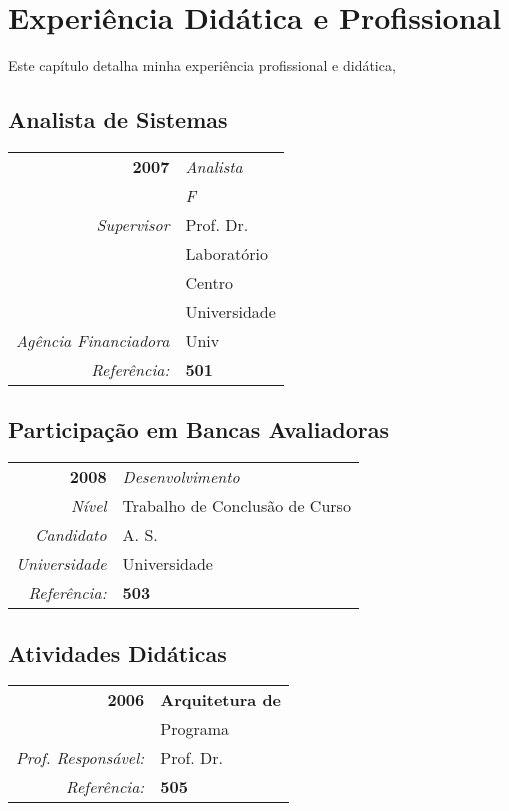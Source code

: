 \chapter{Experiência Didática e Profissional}
Este capítulo detalha minha experiência profissional e didática, 


\section{Analista de Sistemas}
\begin{center}
\begin{tabular}[t]{rl}
\textbf{2007} &\textit{Analista } \\
              & \textit{F} \\
\textit{Supervisor} & Prof. Dr.  \\
              & Laboratório \\
              & Centro \\
              & Universidade \\
\textit{Agência Financiadora} & Univ \\
\textit{Referência:} & \textbf{501} \\
\end{tabular}
\end{center}


\section{Participação em Bancas Avaliadoras}
\begin{center}
\begin{tabular}[t]{rl}
\textbf{2008}    &\textit{Desenvolvimento   }\\
\textit{Nível}   & Trabalho de Conclusão de Curso\\
\textit{Candidato}    & A. S.  \\
\textit{Universidade} & Universidade  \\
\textit{Referência:} & \textbf{503} \\

\end{tabular}
\end{center}

\section{Atividades Didáticas}
\begin{center}
\begin{tabular}[t]{rl}
\textbf{2006} &\textbf{Arquitetura de} \\
              & Programa \\
\textit{Prof. Responsável:}  & Prof. Dr.  \\
\textit{Referência:} & \textbf{505} \\

\end{tabular}
\end{center}

